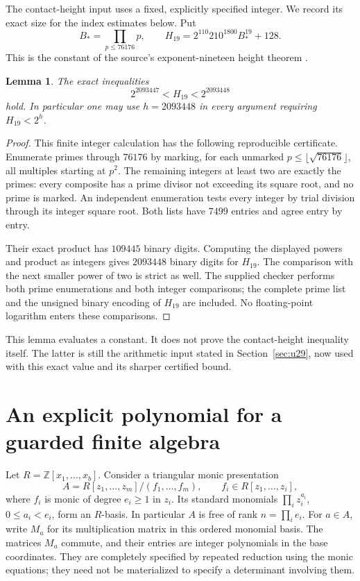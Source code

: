 \documentclass[11pt,a4paper]{article}
\newtheorem{lemma}[theorem]{Lemma}
\theoremstyle{definition}
\theoremstyle{remark}
\begin{document}
The contact-height input uses a fixed, explicitly specified integer.
We record its exact size for the index estimates below. Put
\[
 B_*=\prod_{p\le76176}p,\qquad
 H_{19}=2^{110}210^{1800}B_*^{19}+128.
\]
This is the constant of the source's exponent-nineteen height theorem
\cite[Theorem \nolinkurl{thm:quartic-height19}]{RepositoryV9}.

\begin{lemma}\label{lem:exact-height-constant}
The exact inequalities
\[
                 2^{2093447}<H_{19}<2^{2093448}
\]
hold. In particular one may use $h=2093448$ in every argument
requiring $H_{19}<2^h$.
\end{lemma}
\begin{proof}
This finite integer calculation has the following reproducible
certificate. Enumerate primes through $76176$ by marking, for
each unmarked $p\le\lfloor\sqrt{76176}\rfloor$, all multiples
starting at $p^2$. The remaining integers at least two are
exactly the primes: every composite has a prime divisor not
exceeding its square root, and no prime is marked.
An independent enumeration tests every integer by trial division
through its integer square root. Both lists have $7499$ entries
and agree entry by entry.

Their exact product has $109445$ binary digits. Computing the
displayed powers and product as integers gives $2093448$ binary
digits for $H_{19}$. The comparison with the next smaller power
of two is strict as well. The supplied checker performs both
prime enumerations and both integer comparisons; the complete
prime list and the unsigned binary encoding of $H_{19}$ are
included. No floating-point logarithm enters these comparisons.
\end{proof}

This lemma evaluates a constant. It does not prove the
contact-height inequality itself. The latter is still the
arithmetic input stated in Section~\ref{sec:u29}, now used with
this exact value and its sharper certified bound.


\section{An explicit polynomial for a guarded finite algebra}
\label{sec:explicit-finite-algebra}

Let $R=\mathbb Z[x_1,\ldots,x_b]$. Consider a triangular monic presentation
\[
 A=R[z_1,\ldots,z_m]/(f_1,\ldots,f_m),\qquad
 f_i\in R[z_1,\ldots,z_i],
\]
where $f_i$ is monic of degree $e_i\ge1$ in $z_i$. Its standard
monomials $\prod_i z_i^{a_i}$, $0\le a_i<e_i$, form an $R$-basis.
In particular $A$ is free of rank $n=\prod_i e_i$. For $a\in A$,
write $M_a$ for its multiplication matrix in this ordered monomial basis.
The matrices $M_a$ commute, and their entries are integer polynomials in
the base coordinates. They are completely specified by repeated reduction
using the monic equations; they need not be materialized to specify a
determinant involving them.
\end{document}
